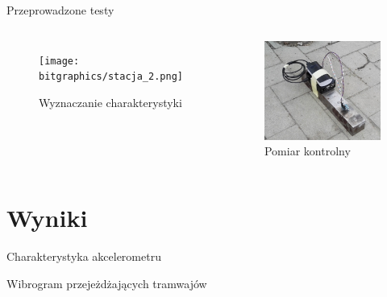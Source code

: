 \documentclass[aspectratio=1610,polish]{beamer} %
\begin{document}
  \begin{frame}{Przeprowadzone testy}
    \begin{columns}
      \begin{figure}
        \texttt{[image: bitgraphics/stacja\_2.png]}
        \caption{Wyznaczanie charakterystyki}
      \end{figure}
      \begin{figure}
        \includegraphics[width=\textwidth]{bitgraphics/stacja_1.png}
        \caption{Pomiar kontrolny}
      \end{figure}
    \end{columns}
  \end{frame}
  \section{Wyniki}
  \begin{frame}{Charakterystyka akcelerometru}
    \begin{figure}
      
    \end{figure}
  \end{frame}
  \begin{frame}{Wibrogram przejeżdżających tramwajów}
    \begin{figure}
      
    \end{figure}
  \end{frame}
\end{document}
